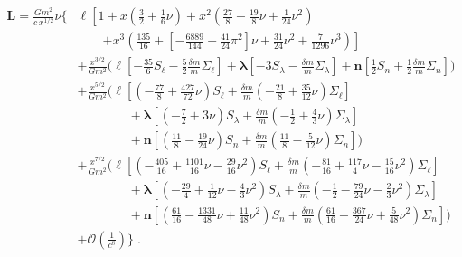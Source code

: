 \begin{align}
\mathbf{L}=\frac{G m^2 }{c\,  x^{1/2}}\nu \Bigg\{ &
\boldsymbol\ell\left[
1
+x \left(\frac{3}{2} + \frac{1}{6} \nu\right)
+x^2 \left(\frac{27}{8} -\frac{19}{8} \nu + \frac{1}{24} \nu^2\right)\right.\nonumber\\
&\qquad\left.+x^3 \left(\frac{135}{16} +\left[- \frac{6889}{144} + \frac{41}{24} \pi^2\right] \nu +\frac{31}{24} \nu^2 + \frac{7}{1296} \nu^3 \right)\right] \nonumber\\
&+\frac{x^{3/2}}{G m^2}\Bigg(
\boldsymbol\ell\left[-\frac{35}{6}S_\ell-\frac{5}{2}\frac{\delta m}{m}\Sigma _\ell\right]
+\boldsymbol\lambda\left[-3S_{\lambda }-\frac{\delta m}{m}\Sigma _{\lambda }\right]
+\mathbf{n}\left[\frac{1}{2}S_n+\frac{1}{2}\frac{\delta m}{m}\Sigma _n\right]
\Bigg)\nonumber\\
&+\frac{x^{5/2}}{G m^2}\Bigg(
\boldsymbol\ell\left[\left(-\frac{77}{8} + \frac{427}{72} \nu\right)S_\ell+\frac{\delta m}{m}\left(-\frac{21}{8} + \frac{35}{12} \nu\right)\Sigma _\ell\right]\nonumber\\
&\qquad\qquad+\boldsymbol\lambda\left[\left(-\frac{7}{2} + 3 \nu\right)S_{\lambda }+\frac{\delta m}{m}\left(-\frac{1}{2} + \frac{4}{3} \nu\right)\Sigma _{\lambda }\right]\nonumber\\
&\qquad\qquad+\mathbf{n}\left[\left(\frac{11}{8} -\frac{19}{24} \nu\right)S_n+\frac{\delta m}{m}\left(\frac{11}{8} -\frac{5}{12} \nu\right)\Sigma _n\right]
\Bigg)\nonumber\\
&+\frac{x^{7/2}}{G m^2}\Bigg(
\boldsymbol\ell\left[\left(-\frac{405}{16} + \frac{1101}{16} \nu -\frac{29}{16} \nu^2\right)S_\ell+\frac{\delta m}{m}\left(-\frac{81}{16} + \frac{117}{4} \nu -\frac{15}{16} \nu^2\right)\Sigma _\ell\right]\nonumber\\
&\qquad\qquad
+\boldsymbol\lambda\left[\left(-\frac{29}{4} + \frac{1}{12} \nu -\frac{4}{3} \nu^2\right)S_{\lambda }+\frac{\delta m}{m}\left(-\frac{1}{2} -\frac{79}{24} \nu -\frac{2}{3} \nu^2\right)\Sigma _{\lambda }\right]\nonumber\\
&\qquad\qquad
+\mathbf{n}\left[\left(\frac{61}{16} -\frac{1331}{48} \nu + \frac{11}{48} \nu^2\right)S_n+\frac{\delta m}{m}\left(\frac{61}{16} -\frac{367}{24} \nu + \frac{5}{48} \nu^2\right)\Sigma _n\right]
\Bigg)\nonumber\\
&+\mathcal{O}\left(\frac{1}{c^8}\right)
\Bigg\} \;.
\end{align}


























